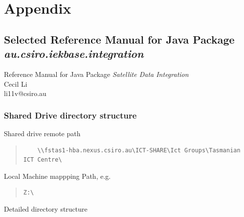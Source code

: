 
\chapter{Appendix}\label{ch:appendix}

\section{Selected Reference Manual for Java Package \textbf{\emph{au.csiro.iekbase.integration}}}
\label{manual}
\begin{center}\Large
Reference Manual for Java Package \emph{Satellite Data Integration}\\
Cecil Li\\li11v@csiro.au
\end{center}
\subsection{Shared Drive directory structure}
Shared drive remote path
\begin{quote}\begin{verbatim}  
	\\fstas1-hba.nexus.csiro.au\ICT-SHARE\Ict Groups\Tasmanian ICT Centre\
\end{verbatim}\end{quote}
Local Machine mappping Path, e.g.
\begin{quote}\begin{verbatim}  
Z:\
\end{verbatim}\end{quote}
Detailed directory structure

